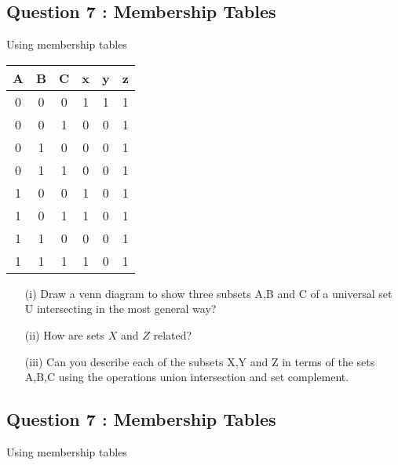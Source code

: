 \documentclass[11pt,a4paper,titlepage,oneside,openany]{article}
\numberwithin{equation}{section}
\numberwithin{algorithm}{section}
\numberwithin{figure}{section}
\numberwithin{table}{section}
\begin{document}
\subsection*{Question 7 : Membership Tables}
Using membership tables
\begin{tabular}{|ccc|c|c|c|}
\hline
A & B & C & x & y & z \\\hline
0 & 0 & 0 & 1 & 1 & 1 \\
0 & 0 & 1 & 0 & 0 & 1 \\
0 & 1 & 0 & 0 & 0 & 1 \\
0 & 1 & 1 & 0 & 0 & 1 \\
1 & 0 & 0 & 1 & 0 & 1 \\
1 & 0 & 1 & 1 & 0 & 1 \\
1 & 1 & 0 & 0 & 0 & 1 \\
1 & 1 & 1 & 1 & 0 & 1 \\
\hline
\end{tabular}
\begin{itemize}
\item[(i)] Draw a venn diagram to show three subsets A,B and C of a universal set U intersecting in
the most general way?
\item[(ii)] How are sets $X$ and $Z$ related?
\item[(iii)] Can you describe each of the subsets X,Y and Z in terms  of the
sets A,B,C using the operations union intersection and set complement.
\end{itemize}

\subsection*{Question 7 : Membership Tables}
Using membership tables
\end{document}
